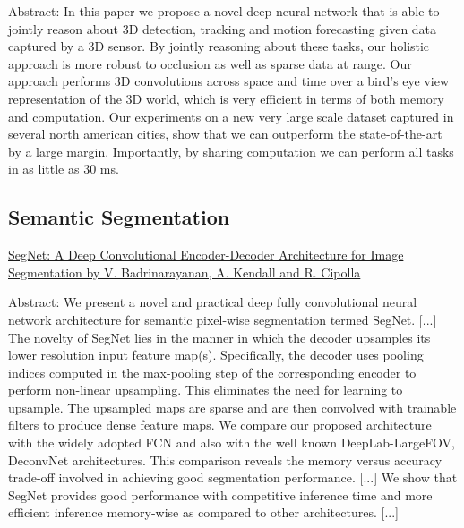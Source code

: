 \documentclass[11pt, a4paper]{article}
\begin{document}
Abstract: In this paper we propose a novel deep neural network that is able to jointly reason about 3D detection, tracking and motion forecasting given data captured by a 3D sensor. By jointly reasoning about these tasks, our holistic approach is more robust to occlusion as well as sparse data at range. Our approach performs 3D convolutions across space and time over a bird’s eye view representation of the 3D world, which is very efficient in terms of both memory and computation. Our experiments on a new very large scale dataset captured in several north american cities, show that we can outperform the state-of-the-art by a large margin. Importantly, by sharing computation we can perform all tasks in as little as 30 ms.


\subsection{Semantic Segmentation}%
\label{sub:semantic_segmentation}

\href{https://arxiv.org/abs/1511.00561}{SegNet: A Deep Convolutional Encoder-Decoder Architecture for Image Segmentation by V. Badrinarayanan, A. Kendall and R. Cipolla}


Abstract: We present a novel and practical deep fully convolutional neural network architecture for semantic pixel-wise segmentation termed SegNet. [...] The novelty of SegNet lies in the manner in which the decoder upsamples its lower resolution input feature map(s). Specifically, the decoder uses pooling indices computed in the max-pooling step of the corresponding encoder to perform non-linear upsampling. This eliminates the need for learning to upsample. The upsampled maps are sparse and are then convolved with trainable filters to produce dense feature maps. We compare our proposed architecture with the widely adopted FCN and also with the well known DeepLab-LargeFOV, DeconvNet architectures. This comparison reveals the memory versus accuracy trade-off involved in achieving good segmentation performance. [...] We show that SegNet provides good performance with competitive inference time and more efficient inference memory-wise as compared to other architectures. [...]
\end{document}
